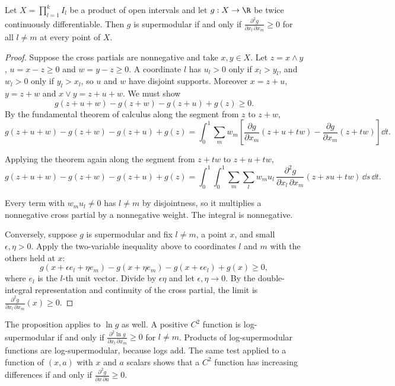 \begin{proposition}\label{prop:B-smooth-supermod}
Let $X = \prod_{l=1}^k I_l$ be a product of open intervals and let $g : X \to \R$ be twice continuously
differentiable. Then $g$ is supermodular if and only if $\frac{\partial^2g}{\partial x_l\,\partial x_m} \geq 0$ for all
$l \neq m$ at every point of $X$.
\end{proposition}

\begin{proof}
Suppose the cross partials are nonnegative and take $x, y \in X$. Let $z = x \wedge y$, $u = x - z \geq 0$ and
$w = y - z \geq 0$. A coordinate $l$ has $u_l > 0$ only if $x_l > y_l$, and $w_l > 0$ only if $y_l > x_l$, so $u$ and $w$
have disjoint supports. Moreover $x = z + u$, $y = z + w$ and $x \vee y = z + u + w$. We must show
\[
  g(z + u + w) - g(z + w) - g(z + u) + g(z) \geq 0\text{.}
\]
By the fundamental theorem of calculus along the segment from $z$ to $z + w$,
\[
  g(z + u + w) - g(z + w) - g(z + u) + g(z) = \int_0^1 \sum_m w_m\left[\frac{\partial g}{\partial x_m}(z + u + tw) - \frac{\partial g}{\partial x_m}(z + tw)\right]\dd t\text{.}
\]

Applying the theorem again along the segment from $z + tw$ to $z + u + tw$,
\[
  g(z + u + w) - g(z + w) - g(z + u) + g(z) = \int_0^1\!\!\int_0^1 \sum_m\sum_l w_mu_l\,\frac{\partial^2g}{\partial x_l\,\partial x_m}(z + su + tw)\,\dd s\,\dd t\text{.}
\]

Every term with $w_mu_l \neq 0$ has $l \neq m$ by disjointness, so it multiplies a nonnegative cross partial by a
nonnegative weight. The integral is nonnegative.

Conversely, suppose $g$ is supermodular and fix $l \neq m$, a point $x$, and small $\epsilon, \eta > 0$. Apply the
two-variable inequality above to coordinates $l$ and $m$ with the others held at $x$:
\[
  g(x + \epsilon e_l + \eta e_m) - g(x + \eta e_m) - g(x + \epsilon e_l) + g(x) \geq 0,
\]
where $e_l$ is the $l$-th unit vector. Divide by $\epsilon\eta$ and let $\epsilon, \eta \to 0$. By the double-integral
representation and continuity of the cross partial, the limit is $\frac{\partial^2g}{\partial x_l\,\partial x_m}(x) \geq 0$.
\end{proof}

The proposition applies to $\ln g$ as well. A positive $C^2$ function is log-supermodular if and only if
$\frac{\partial^2\ln g}{\partial x_l\,\partial x_m} \geq 0$ for $l \neq m$. Products of log-supermodular functions are
log-supermodular, because logs add. The same test applied to a function of $(x, a)$ with $x$ and $a$ scalars shows
that a $C^2$ function has increasing differences if and only if $\frac{\partial^2g}{\partial x\,\partial a} \geq 0$.

